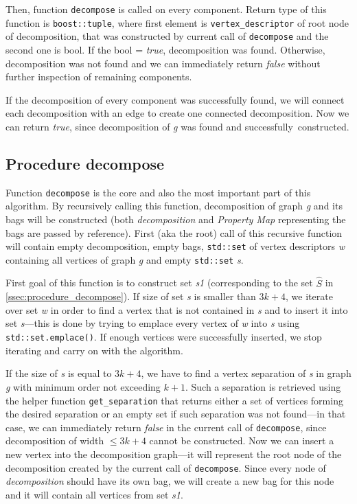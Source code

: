 \documentclass[thesis=B,english]{FITthesis}[2019/03/21]
\begin{document}
Then, function \texttt{decompose} is called on every component. Return type of this function is \texttt{boost::tuple}, where first element is \texttt{vertex\_descriptor} of root node of decomposition, that was constructed by current call of \texttt{decompose} and the second one is bool. If the bool = \emph{true}, decomposition was found. Otherwise, decomposition was not found and we can immediately return \emph{false} without further inspection of remaining components.

If the decomposition of every component was successfully found, we will connect each decomposition with an edge to create one connected decomposition. Now we can return \emph{true}, since decomposition of \emph{g} was found and successfully~constructed.

\subsection{Procedure decompose}
Function \texttt{decompose} is the core and also the most important part of this algorithm. By recursively calling this function, decomposition of graph \emph{g} and its bags will be constructed (both \emph{decomposition} and \emph{Property Map} representing the bags are passed by reference). First (aka the root) call of this recursive function will contain empty decomposition, empty bags, \texttt{std::set} of vertex descriptors \emph{w} containing all vertices of graph \emph{g} and empty \texttt{std::set} \emph{s}.

First goal of this function is to construct set \emph{s1} (corresponding to the set $\widehat{S}$ in \autoref{ssec:procedure_decompose}). If size of set \emph{s} is smaller than $3k + 4$, we iterate over set \emph{w} in order to find a vertex that is not contained in \emph{s} and to insert it into set \emph{s}---this is done by trying to emplace every vertex of \emph{w} into \emph{s} using \texttt{std::set.emplace()}. If enough vertices were successfully inserted, we stop iterating and carry on with the algorithm.

If the size of \emph{s} is equal to $3k + 4$, we have to find a vertex separation of \emph{s} in graph \emph{g} with minimum order not exceeding $k+1$. Such a separation is retrieved using the helper function \texttt{get\_separation} that returns either a set of vertices forming the desired separation or an empty set if such separation was not found---in that case, we can immediately return \emph{false} in the current call of \texttt{decompose}, since decomposition of width $\leq 3k+4$ cannot be constructed.
\newpage
Now we can insert a new vertex into the decomposition graph---it will represent the root node of the decomposition created by the current call of \texttt{decompose}. Since every node of \emph{decomposition} should have its own bag, we will create a new bag for this node and it will contain all vertices from set \emph{s1}.
\end{document}
